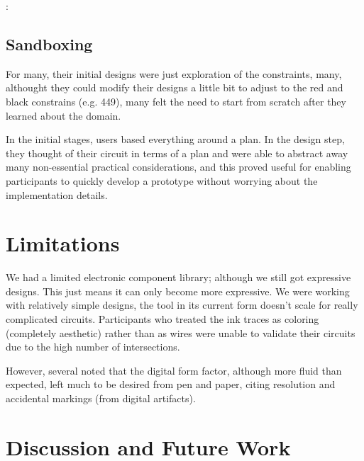 \documentclass{sigchi}
\begin{document}
  \begin{myquote}
   \vspace{-2pt}
    :
    \vspace{-2pt}
  \end{myquote}
  
  \subsection{Sandboxing}
    For many, their initial designs were just exploration of the constraints, many, althought they could modify their designs a little bit to adjust to the red and black constrains (e.g. 449), many felt the need to start from scratch after they learned about the domain.
    
    In the initial stages, users based everything around a plan. In the design step, they thought of their circuit in terms of a plan and were able to abstract away many non-essential practical considerations, and this proved useful for enabling participants to quickly develop a prototype without worrying about the implementation details.

\section{Limitations}
  We had a limited electronic component library; although we still got expressive designs. This just means it can only become more expressive. We were working with relatively simple designs, the tool in its current form doesn't scale for really complicated circuits. Participants who treated the ink traces as coloring (completely aesthetic) rather than as wires were unable to validate their circuits due to the high number of intersections.
  
  However, several noted that the digital form factor, although more fluid than expected, left much to be desired from pen and paper, citing resolution and accidental markings (from digital artifacts). 


\section {Discussion and Future Work}
\end{document}
